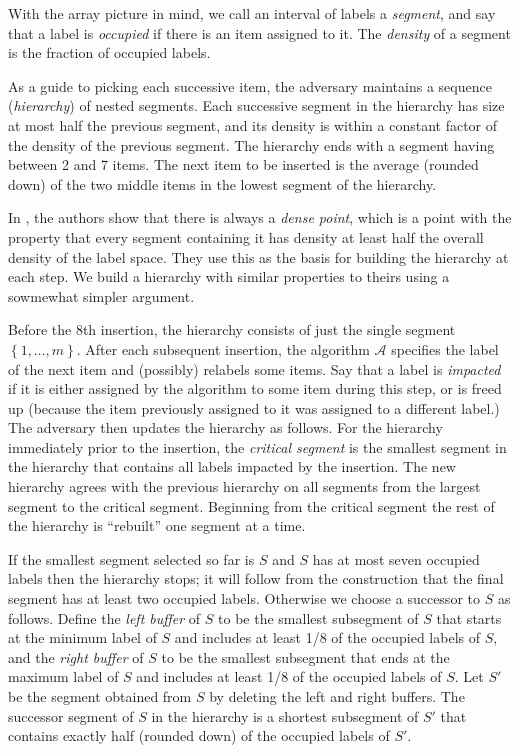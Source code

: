 \documentclass[unicode,review]{siamart1116}
\newcommand{\A}{\mathcal{A}}
\newcommand{\natInt}[2]{ \left\{ #1, \dotsc, #2 \right\} }
\numberwithin{theorem}{section}
\begin{document}
With the array picture in mind,
we  call an interval of labels a \emph{segment}, and say that a label is {\em occupied} if there is an item assigned to it.
The \emph{density} of a segment is the fraction of occupied labels.

As a guide to picking each successive item, the adversary maintains a sequence (\emph{hierarchy}) of nested segments.  Each successive segment in the hierarchy
has size at most half the previous segment, and its density  is within a constant factor of the density of the previous segment.
The hierarchy ends with a segment having between 2 and 7 items.  The next item to be inserted is the average (rounded down)
of the two middle items in the lowest segment of the hierarchy.

In \cite{DSZ04}, the authors show that there is always a \emph{dense point}, which is
a point  with the property that every segment containing it
has density at least half the overall density of the label space.  They use this as the basis for building the hierarchy at each
step.
We build a hierarchy with similar properties to theirs using a sowmewhat simpler argument.


Before the 8th insertion, the hierarchy consists of just the single segment $\natInt{1}{m}$.
After each subsequent insertion,
the algorithm $\A$ specifies the label of the next item and (possibly) relabels some items. Say that a label is {\em impacted} if
it is either assigned by the algorithm to some item during this step, or is freed up (because the item previously
assigned to it was  assigned to a different label.) The adversary then updates the hierarchy as follows.  For the hierarchy immediately prior to the insertion, the {\em critical segment} is the smallest segment in the hierarchy that contains all 
labels impacted by the insertion.
The new hierarchy agrees with the previous hierarchy on all segments from the largest segment to 
the critical segment.   Beginning from the critical segment the rest of the hierarchy is ``rebuilt'' one segment at a time.

If the smallest segment selected so far is $S$ and $S$ has at most seven occupied labels then
the hierarchy stops; it will follow from the construction that the final segment has at least
two occupied labels.  Otherwise we choose a successor to $S$ as follows.
Define the
{\em left buffer} of $S$
to be the smallest subsegment of $S$ that starts at the minimum label of $S$ and
includes at least 1/8 of the occupied labels of $S$, and the {\em right buffer} of $S$ to be the smallest subsegment that ends at the maximum label of $S$
and includes at least 1/8 of the occupied labels of $S$.
Let $S'$ be the segment obtained from $S$ by
deleting the left and right buffers. The successor segment of $S$ in the hierarchy is
a shortest subsegment of $S'$ that contains exactly half (rounded down) of the occupied labels of $S'$.
\end{document}
